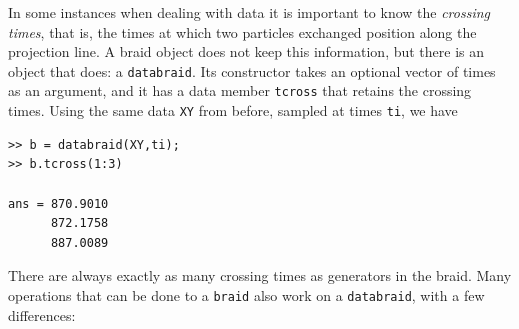 \documentclass[12pt]{article}
\begin{document}
In some instances when dealing with data it is important to know the
\emph{crossing times}, %
%
that is, the times at which two particles exchanged position along the
projection line. %
%
A braid object does not keep this information, but there is an object that
does: a \lstinline{databraid}. %
%
Its constructor takes an optional vector of times as an argument, and it has a
data member \lstinline{tcross} %
%
that retains the crossing times.  Using the same data \lstinline{XY} from
before, sampled at times \lstinline{ti}, we have
\begin{lstlisting}[frame=single,framerule=0pt]
>> b = databraid(XY,ti);
>> b.tcross(1:3)

ans = 870.9010
      872.1758
      887.0089
\end{lstlisting}
%
There are always exactly as many crossing times as generators in the braid.
Many operations that can be done to a \lstinline{braid} also work on a
\lstinline{databraid}, with a few differences:
\end{document}
